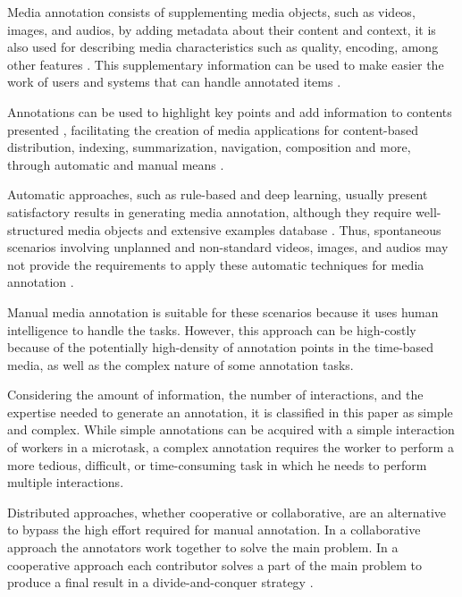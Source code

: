
Media annotation consists of supplementing media objects, such as videos, images, and audios, by adding metadata about their content and context, it is also used for describing media characteristics such as quality, encoding, among other features \cite{Wang:2009:BDM:1652990.1653002}. This supplementary information can be used to make easier the work of users and systems that can handle annotated items \cite{172450}. 

Annotations can be used to highlight key points and add information to contents presented \cite{Cunha:2015:MVA:2820426.2820449}, facilitating the creation of media applications for content-based distribution, indexing, summarization, navigation, composition and more, through automatic and manual means \cite{Wang:2011:ALM:1899412.1899414,Mihalcea:2007:WLD:1321440.1321475}. 

Automatic approaches, such as rule-based and deep learning, usually present satisfactory results in generating media annotation, although they require well-structured media objects and extensive examples database \cite{lecun2015deep}. Thus, spontaneous scenarios involving unplanned and non-standard videos, images, and audios may not provide the requirements to apply these automatic techniques for media annotation \cite{murthy2015automatic}. 

Manual media annotation is suitable for these scenarios because it uses human intelligence to handle the tasks. However, this approach can be high-costly because of the potentially high-density of annotation points in the time-based media, as well as the complex nature of some annotation tasks.

Considering the amount of information, the number of interactions, and the expertise needed to generate an annotation, it is classified in this paper as simple and complex. While simple annotations can be acquired with a simple interaction of workers in a microtask, a complex annotation requires the worker to perform a more tedious, difficult, or time-consuming task in which he needs to perform multiple interactions.

Distributed approaches, whether cooperative or collaborative, are an alternative to bypass the high effort required for manual annotation. In a collaborative approach the annotators work together to solve the main problem. In a cooperative approach each contributor solves a part of the main problem to produce a final result in a divide-and-conquer strategy  \cite{misanchuk2001building}.

